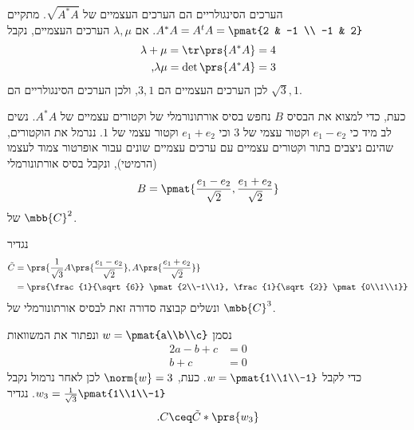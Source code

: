 \documentclass[a4paper,10pt,twoside,openany]{book}
\begin{document}
\begin{solution}
הערכים הסינגולריים הם הערכים העצמיים של
$\sqrt{A^* A}$.
מתקיים
$A^* A = A^t A = \pmat{2 & -1 \\ -1 & 2}$.
אם
$\lambda, \mu$
הערכים העצמיים, נקבל
\begin{align*}
\lambda + \mu = \tr\prs{A^* A} = 4 \\
\text{,} \lambda \mu = \det\prs{A^* A} = 3
\end{align*}
לכן הערכים העצמיים הם
$3,1$,
ולכן הערכים הסינגולריים הם
$\sqrt{3}, 1$.

כעת, כדי למצוא את הבסיס
$B$
נחפש בסיס אורתונורמלי של וקטורים עצמיים של
$A^* A$.
נשים לב מיד כי
$e_1 - e_2$
וקטור עצמי של
$3$
וכי
$e_1 + e_2$
וקטור עצמי של
$1$.
ננרמל את הוקטורים, שהינם ניצבים בתור וקטורים עצמיים עם ערכים עצמיים שונים עבור אופרטור צמוד לעצמו (הרמיטי), ונקבל בסיס אורתונורמלי
\[B = \pmat{\frac{e_1 - e_2}{\sqrt{2}}, \frac{e_1 + e_2}{\sqrt{2}}}\]
של
$\mbb{C}^2$.

נגדיר
\begin{align*}
\tilde{C} &= \prs{\frac{1}{\sqrt{3}} A \prs{\frac{e_1 - e_2}{\sqrt{2}}}, A\prs{\frac{e_1 + e_2}{\sqrt{2}}}}
\\&= \prs{\frac{1}{\sqrt{6}} \pmat{2\\-1\\1}, \frac{1}{\sqrt{2}} \pmat{0\\1\\1}}
\end{align*}
ונשלים קבוצה סדורה זאת לבסיס אורתונורמלי של
$\mbb{C}^3$.

נסמן
$w = \pmat{a\\b\\c}$
ונפתור את המשוואות
\begin{align*}
2a - b + c &= 0\\
b + c &= 0
\end{align*}
כדי לקבל
$w = \pmat{1\\1\\-1}$.
כעת,
$\norm{w} = 3$
לכן לאחר נרמול נקבל
$w_3 = \frac{1}{\sqrt{3}} \pmat{1\\1\\-1}$.
נגדיר
\begin{align*}
\text{.} C \ceq \tilde{C} * \prs{w_3}
\end{align*}


\end{solution}
\end{document}
